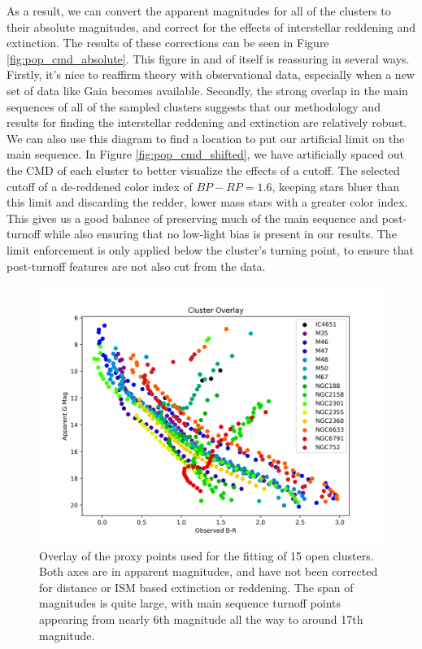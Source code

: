 \documentclass[onecolumn,table,xcdraw,super]{aastex631}
\begin{document}
As a result, we can convert the apparent magnitudes for all of the clusters to their absolute magnitudes, and correct for the effects of interstellar reddening and extinction. The results of these corrections can be seen in Figure \ref{fig:pop_cmd_absolute}. This figure in and of itself is reassuring in several ways. Firstly, it's nice to reaffirm theory with observational data, especially when a new set of data like Gaia becomes available. Secondly, the strong overlap in the main sequences of all of the sampled clusters suggests that our methodology and results for finding the interstellar reddening and extinction are relatively robust. We can also use this diagram to find a location to put our artificial limit on the main sequence. In Figure \ref{fig:pop_cmd_shifted}, we have artificially spaced out the CMD of each cluster to better visualize the effects of a cutoff. The selected cutoff of a de-reddened color index of $BP-RP = 1.6$, keeping stars bluer than this limit and discarding the redder, lower mass stars with a greater color index. This gives us a good balance of preserving much of the main sequence and post-turnoff while also ensuring that no low-light bias is present in our results. The limit enforcement is only applied below the cluster's turning point, to ensure that post-turnoff features are not also cut from the data. 

\begin{figure}[]
    \centering
      \includegraphics[width=4.75in]{figures/pop_cmd_apparent.png}
    \caption{Overlay of the proxy points used for the fitting of 15 open clusters. Both axes are in apparent magnitudes, and have not been corrected for distance or ISM based extinction or reddening. The span of magnitudes is quite large, with main sequence turnoff points appearing from nearly 6th magnitude all the way to around 17th magnitude.}
    \label{fig:pop_cmd_apparent}
\end{figure}
\end{document}
